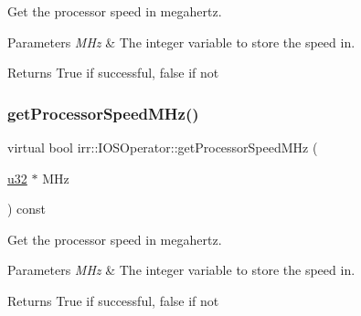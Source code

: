 Get the processor speed in megahertz. 


\begin{DoxyParams}{Parameters}
{\em M\+Hz} & The integer variable to store the speed in. \\
\hline
\end{DoxyParams}
\begin{DoxyReturn}{Returns}
True if successful, false if not 
\end{DoxyReturn}
\mbox{\label{classirr_1_1IOSOperator_abc61b8016ec35125ef94adea42209ecd}} 
\subsubsection{\texorpdfstring{get\+Processor\+Speed\+M\+Hz()}{getProcessorSpeedMHz()}\hspace{0.1cm}{\footnotesize\ttfamily [2/2]}}
{\footnotesize\ttfamily virtual bool irr\+::\+I\+O\+S\+Operator\+::get\+Processor\+Speed\+M\+Hz (\begin{DoxyParamCaption}\item[{\hyperlink{namespaceirr_a0416a53257075833e7002efd0a18e804}{u32} $\ast$}]{M\+Hz }\end{DoxyParamCaption}) const\hspace{0.3cm}{\ttfamily [pure virtual]}}



Get the processor speed in megahertz. 


\begin{DoxyParams}{Parameters}
{\em M\+Hz} & The integer variable to store the speed in. \\
\hline
\end{DoxyParams}
\begin{DoxyReturn}{Returns}
True if successful, false if not 
\end{DoxyReturn}
\mbox{\label{classirr_1_1IOSOperator_af58b50cecf28f247e1f302ee0b9e8270}} 
